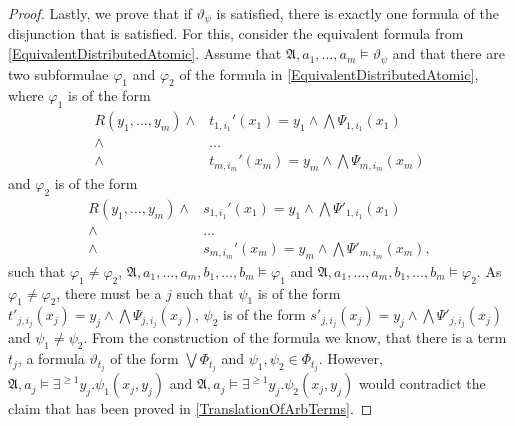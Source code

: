 \documentclass[a4paper,11pt,DIV=15]{scrartcl} %
\renewcommand{\phi}{\varphi}
\theoremstyle{plain}
\theoremstyle{definition}
\renewcommand{\theta}{\vartheta}
\begin{document}
\begin{proof}
	Lastly, we prove that if $\theta_\psi$ is satisfied, there is exactly one formula of the disjunction that is satisfied.
	For this, consider the equivalent formula from \cref{EquivalentDistributedAtomic}.
	Assume that $\mathfrak A,a_1,\dots,a_m\models \theta_\psi$ and that there are two subformulae $\phi_1$ and $\phi_2$ of the formula in \cref{EquivalentDistributedAtomic}, where $\phi_1$ is of the form 
	\begin{align*}
		R(y_1,\dots,y_m)\land & t_{1,i_1}'(x_1)=y_1 \land \bigwedge\Psi_{1,i_1}(x_1) \\
		\land & \dots \\
		\land & t_{m,i_m}'(x_m)=y_m \land \bigwedge\Psi_{m,i_m}(x_m)
	\end{align*}
	and $\phi_2$ is of the form
	\begin{align*}
		R(y_1,\dots,y_m)\land & s_{1,i_1}'(x_1)=y_1 \land \bigwedge\Psi'_{1,i_1}(x_1) \\
		\land & \dots \\
		\land & s_{m,i_m}'(x_m)=y_m \land \bigwedge\Psi'_{m,i_m}(x_m),
	\end{align*}
	such that $\phi_1\neq\phi_2$, $\mathfrak A,a_1,\dots,a_m,b_1,\dots,b_m\models \phi_1$ and $\mathfrak A,a_1,\dots,a_m,b_1,\dots,b_m\models \phi_2$.
	As $\phi_1\neq \phi_2$, there must be a $j$ such that $\psi_1$ is of the form $t'_{j,i_j}(x_j)=y_j\land \bigwedge \Psi_{j,i_j}(x_j)$, $\psi_2$ is of the form $s'_{j,i_j}(x_j)=y_j\land\bigwedge \Psi'_{j,i_j}(x_j)$ and $\psi_1\neq\psi_2$.
	From the construction of the formula we know, that there is a term $t_j$, a formula $\theta_{t_j}$ of the form $\bigvee \Phi_{t_j}$ and $\psi_1,\psi_2\in\Phi_{t_j}$.
	However, $\mathfrak A,a_j\models \exists^{\geq 1}y_j . \psi_1(x_j,y_j)$ and $\mathfrak A,a_j\models \exists^{\geq 1}y_j.\psi_2(x_j,y_j)$ would contradict the claim that has been proved in \cref{TranslationOfArbTerms}.
\end{proof}
\end{document}

